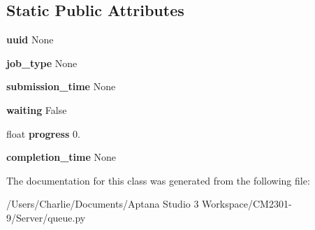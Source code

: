 \subsection*{Static Public Attributes}
\begin{DoxyCompactItemize}
\item 
\hypertarget{classqueue_1_1_queue_item_af790caa69632f7d36059c340ff572efe}{{\bfseries uuid} None}\label{classqueue_1_1_queue_item_af790caa69632f7d36059c340ff572efe}

\item 
\hypertarget{classqueue_1_1_queue_item_ad7f6afef5067cd89c2c44193e46171a0}{{\bfseries job\-\_\-type} None}\label{classqueue_1_1_queue_item_ad7f6afef5067cd89c2c44193e46171a0}

\item 
\hypertarget{classqueue_1_1_queue_item_aa8f8230cef6f9211acd084f9acb9ecb7}{{\bfseries submission\-\_\-time} None}\label{classqueue_1_1_queue_item_aa8f8230cef6f9211acd084f9acb9ecb7}

\item 
\hypertarget{classqueue_1_1_queue_item_a0eebd4a1885a8192f6a440109e8ae9e1}{{\bfseries waiting} False}\label{classqueue_1_1_queue_item_a0eebd4a1885a8192f6a440109e8ae9e1}

\item 
\hypertarget{classqueue_1_1_queue_item_a1d6ef7968231fead6f07a913d0031d2e}{float {\bfseries progress} 0.}\label{classqueue_1_1_queue_item_a1d6ef7968231fead6f07a913d0031d2e}

\item 
\hypertarget{classqueue_1_1_queue_item_a8c232bf9d64d8b0095eab9faffc94daf}{{\bfseries completion\-\_\-time} None}\label{classqueue_1_1_queue_item_a8c232bf9d64d8b0095eab9faffc94daf}

\end{DoxyCompactItemize}


The documentation for this class was generated from the following file\-:\begin{DoxyCompactItemize}
\item 
/\-Users/\-Charlie/\-Documents/\-Aptana Studio 3 Workspace/\-C\-M2301-\/9/\-Server/queue.\-py\end{DoxyCompactItemize}

